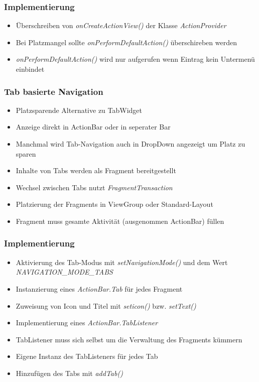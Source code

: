 \begin{frame}
   \frametitle{Implementierung}
   \begin{itemize}
      \item Überschreiben von \emph{onCreateActionView()} der Klasse \emph{ActionProvider}
      \item Bei Platzmangel sollte \emph{onPerformDefaultAction()} überschireben werden
      \item \emph{onPerformDefaultAction()} wird nur aufgerufen wenn Eintrag kein 
         Untermenü einbindet
   \end{itemize}

   
\end{frame}

\begin{frame}
   \frametitle{Tab basierte Navigation}
   \begin{itemize}
      \item Platzsparende Alternative zu TabWidget
      \item Anzeige direkt in ActionBar oder in seperater Bar
      \item Manchmal wird Tab-Navigation auch in DropDown angezeigt um 
         Platz zu sparen
      \item Inhalte von Tabs werden als Fragment bereitgestellt
      \item Wechsel zwischen Tabs nutzt \emph{FragmentTransaction}
      \item Platzierung der Fragments in ViewGroup oder Standard-Layout
      \item Fragment muss gesamte Aktivität (ausgenommen ActionBar) füllen
   \end{itemize}
\end{frame}

\begin{frame}
   \frametitle{Implementierung}
   \begin{itemize}
      \item Aktivierung des Tab-Modus mit \emph{setNavigationMode()} 
         und dem Wert \emph{NAVIGATION\_MODE\_TABS} 
      \item Instanzierung eines \emph{ActionBar.Tab} für jedes Fragment
      \item Zuweisung von Icon und Titel mit \emph{seticon()} bzw. \emph{setText()}
      \item Implementierung eines \emph{ActionBar.TabListener}
      \item TabListener muss sich selbst um die Verwaltung des Fragments kümmern
      \item Eigene Instanz des TabListeners für jedes Tab
      \item Hinzufügen des Tabs mit \emph{addTab()}
   \end{itemize}
\end{frame}

